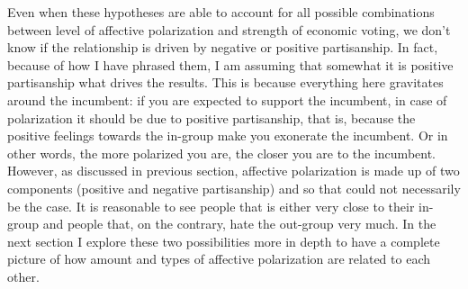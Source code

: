 \documentclass[a4paper, svgnames]{article}
\begin{document}




Even when these hypotheses are able to account for all possible combinations between level of affective polarization and strength of economic voting, we don't know if the relationship is driven by negative or positive partisanship. In fact, because of how I have phrased them, I am assuming that somewhat it is positive partisanship what drives the results. This is because everything here gravitates around the incumbent: if you are expected to support the incumbent, in case of polarization it should be due to positive partisanship, that is, because the positive feelings towards the in-group make you exonerate the incumbent. Or in other words, the more polarized you are, the closer you are to the incumbent. However, as discussed in previous section, affective polarization is made up of two components (positive and negative partisanship) and so that could not necessarily be the case. It is reasonable to see people that is either very close to their in-group and people that, on the contrary, hate the out-group very much. In the next section I explore these two possibilities more in depth to have a complete picture of how amount and types of affective polarization are related to each other.

\end{document}
